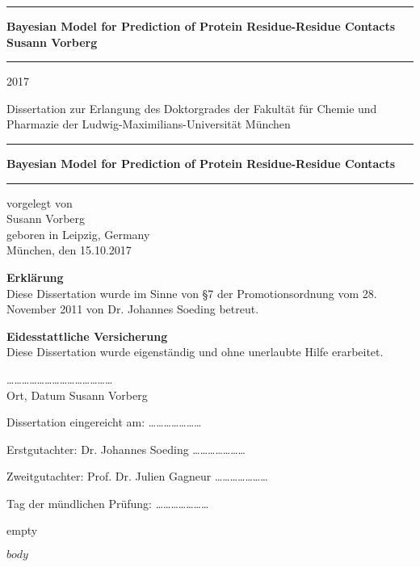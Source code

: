 \documentclass[11pt,a4paper,twoside]{book}
\newcommand{\LMUCover}[3]{
    \thispagestyle{empty}
    {\parindent0cm \rule{\linewidth}{.7ex}}
    
    \begin{flushright}
      \vspace*{\stretch{1}}
      \sffamily\bfseries\Huge
      #1\\
      \vspace*{\stretch{1}}
      \sffamily\bfseries\large
      #2
      \vspace*{\stretch{1}}
    \end{flushright}
  
    \rule{\linewidth}{.7ex}
    \vspace*{\stretch{5}}
    \vspace*{\stretch{1}}
    
    \begin{center}\sffamily\LARGE{#3}\end{center}
}
\newcommand{\LMUTitlePage}[4]{
    \thispagestyle{empty}
    \vspace*{\stretch{1}}
    
    \begin{center}
      \Large Dissertation zur Erlangung des Doktorgrades der Fakultät für Chemie und Pharmazie der Ludwig-Maximilians-Universität München
    \end{center}
    
    \vspace*{\stretch{1}}
    {\parindent0cm \rule{\linewidth}{.7ex}}
    
    \begin{flushright}
      \vspace*{\stretch{1}}
      \sffamily\bfseries\Huge
      #1\\
      \vspace*{\stretch{1}}
    \end{flushright}
  
    \rule{\linewidth}{.7ex}

    \vspace*{\stretch{3}}
    \begin{center}
      \Large vorgelegt von\\
      \Large #2\\
      \Large geboren in #3\\
      \vspace*{\stretch{2}}
      \Large München, den #4
    \end{center}
}
\newcommand{\LMUErklaerung}[5]{
    \thispagestyle{empty}
    \begin{flushleft}
      \large \textbf{Erklärung} \\[1mm]
      \large Diese Dissertation wurde im Sinne von \S7 der Promotionsordnung vom 28. November 2011 von #2 betreut.
      \bigskip
  
      \large \textbf{Eidesstattliche Versicherung}\\[1mm]
      \large Diese Dissertation wurde eigenständig und ohne unerlaubte Hilfe erarbeitet.
      \vspace{5em}
  
      \dots\dots\dots   \dots\dots\dots \hfill \dots\dots\dots\dots\dots\dots\dots\dots\\
      \large Ort, Datum \hfill #1
      \vfill
  
  
      \large Dissertation eingereicht am: \hfill  \dots\dots\dots\dots\dots\dots\dots
      \bigskip
    
      \large Erstgutachter:  #2 \hfill \dots\dots\dots\dots\dots\dots\dots
      \bigskip
    
      \large Zweitgutachter: #3 \hfill \dots\dots\dots\dots\dots\dots\dots
      \bigskip
    
      \large Tag der mündlichen Prüfung: \hfill  \dots\dots\dots\dots\dots\dots\dots
    \end{flushleft}
}
\begin{document}
\frontmatter

\LMUCover
	{Bayesian Model for Prediction of Protein Residue-Residue Contacts}
	{Susann Vorberg}
	{2017}

\newpage
\thispagestyle{empty}
\cleardoublepage

\LMUTitlePage
	{Bayesian Model for Prediction of Protein Residue-Residue Contacts}
	{Susann Vorberg}
	{Leipzig, Germany}
	{15.10.2017}

\newpage
\thispagestyle{empty}
\cleardoublepage

\LMUErklaerung
	{Susann Vorberg}
	{Dr. Johannes Soeding}
	{Prof. Dr. Julien Gagneur}

\newpage
\thispagestyle{empty}
\cleardoublepage
\frontmatter\setcounter{page}{1}

$body$
\end{document}
